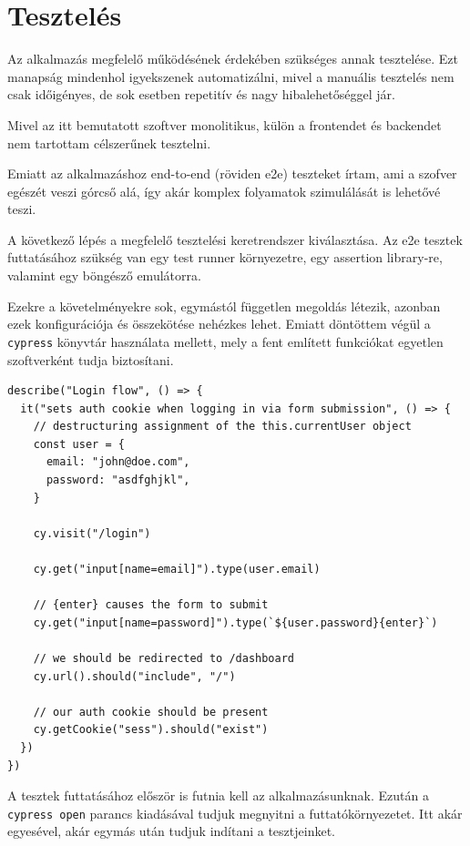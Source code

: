 \chapter{Tesztelés}

Az alkalmazás megfelelő működésének érdekében szükséges annak tesztelése.
Ezt manapság mindenhol igyekszenek automatizálni, mivel a manuális tesztelés nem csak időigényes, de sok esetben
repetitív és nagy hibalehetőséggel jár.

Mivel az itt bemutatott szoftver monolitikus, külön a frontendet és backendet nem tartottam célszerűnek tesztelni.

Emiatt az alkalmazáshoz end-to-end (röviden e2e) teszteket írtam, ami a szofver egészét veszi górcső alá, így akár komplex folyamatok
szimulálását is lehetővé teszi.

A következő lépés a megfelelő tesztelési keretrendszer kiválasztása. Az e2e tesztek futtatásához szükség van egy test runner környezetre, egy assertion library-re, valamint egy böngésző emulátorra.

Ezekre a követelményekre sok, egymástól független megoldás létezik, azonban ezek konfigurációja és összekötése nehézkes lehet.
Emiatt döntöttem végül a \lstinline|cypress| könyvtár használata mellett, mely a fent említett funkciókat egyetlen szoftverként
tudja biztosítani.

\begin{lstlisting}[caption=Bejelentkezés tesztelése]
describe("Login flow", () => {
  it("sets auth cookie when logging in via form submission", () => {
    // destructuring assignment of the this.currentUser object
    const user = {
      email: "john@doe.com",
      password: "asdfghjkl",
    }

    cy.visit("/login")

    cy.get("input[name=email]").type(user.email)

    // {enter} causes the form to submit
    cy.get("input[name=password]").type(`${user.password}{enter}`)

    // we should be redirected to /dashboard
    cy.url().should("include", "/")

    // our auth cookie should be present
    cy.getCookie("sess").should("exist")
  })
})
\end{lstlisting}

A tesztek futtatásához először is futnia kell az alkalmazásunknak. Ezután a \lstinline|cypress open| parancs kiadásával
tudjuk megnyitni a futtatókörnyezetet. Itt akár egyesével, akár egymás után tudjuk indítani a tesztjeinket.

